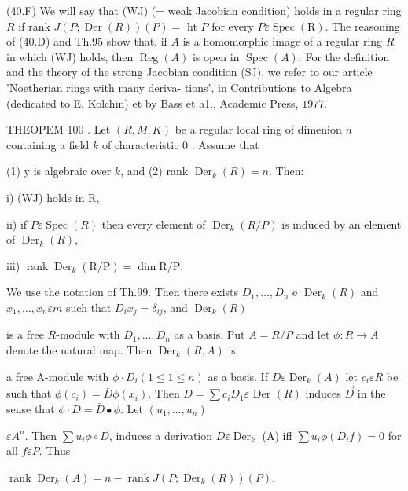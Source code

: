 (40.F) We will say that (WJ) (= weak Jacobian condition) holds in a regular ring $R$ if rank $J(P ; \operatorname{Der}(R))(P)=$ ht $P$ for every $P \varepsilon \operatorname{Spec}(\mathrm{R})$. The reasoning of (40.D) and Th.95 show that, if $A$ is a homomorphic image of a regular ring $R$ in which (WJ) holds, then $\operatorname{Reg}(A)$ is open in $\operatorname{Spec}(A)$. For the definition and the theory of the strong Jacobian condition (SJ), we refer to our article 'Noetherian rings with many deriva- tions', in Contributions to Algebra (dedicated to E. Kolchin) et by Bass et a1., Academic Press, $1977 .$

THEOPEM 100 . Let $(R, M, K)$ be a regular local ring of dimenion $n$ containing a field $k$ of characteristic 0 . Assume that

(1) $\mathrm{y}$ is algebraic over $k$, and (2) rank $\operatorname{Der}_{k}(R)=n$. Then:

i) (WJ) holds in R,

ii) if $P \varepsilon \operatorname{Spec}(R)$ then every element of $\operatorname{Der}_{k}(R / P)$ is induced by an element of $\operatorname{Der}_{k}(R)$,

iii) $\operatorname{rank} \operatorname{Der}_{k}(\mathrm{R} / \mathrm{P})=\operatorname{dim} \mathrm{R} / \mathrm{P}$.

We use the notation of Th.99. Then there exists $D_{1}, \ldots, D_{n}$ e $\operatorname{Der}_{k}(R)$ and $x_{1}, \ldots, x_{n} \varepsilon m$ such that $D_{i} x_{j}=\delta_{i j}$, and $\operatorname{Der}_{k}(R)$

is a free $R$-module with $D_{1}, \ldots, D_{n}$ as a basis. Put $A=R / P$ and let $\phi: R \rightarrow A$ denote the natural map. Then $\operatorname{Der}_{k}(R, A)$ is

a free A-module with $\phi \cdot D_{i}(1 \leqslant 1 \leqslant n)$ as a basis. If $D \varepsilon \operatorname{Der}_{k}(A)$ let $c_{i} \varepsilon R$ be such that $\phi\left(c_{i}\right)=\bar{D} \phi\left(x_{i}\right)$. Then $D=\sum c_{i} D_{1} \varepsilon$ Der $(R)$ induces $\vec{D}$ in the sense that $\phi \cdot D=\bar{D} \bullet \phi$. Let $\left(u_{1}, \ldots, u_{n}\right)$

$\varepsilon A^{n}$. Then $\sum u_{i} \phi \circ D$, induces a derivation $D \varepsilon \operatorname{Der}_{k}$ (A) iff $\sum u_{i} \phi\left(D_{i} f\right)=0$ for all $f \varepsilon P$. Thus

$\operatorname{rank} \operatorname{Der}_{k}(A)=n-\operatorname{rank} J\left(P ; \operatorname{Der}_{k}(R)\right)(P)$.

